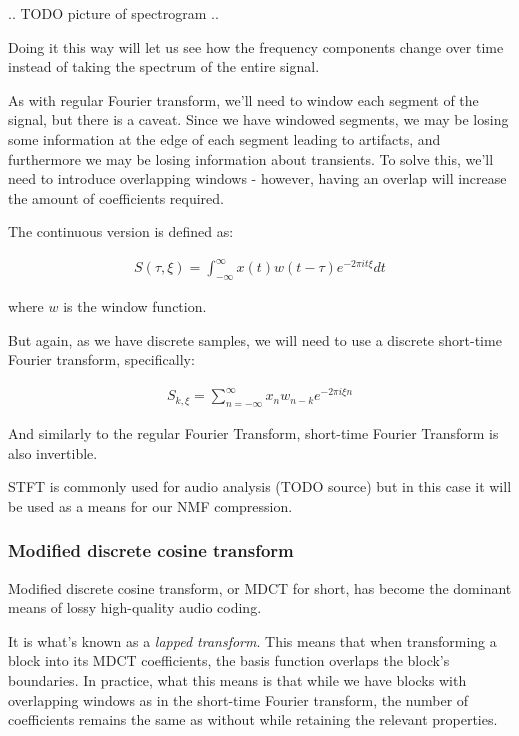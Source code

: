 .. TODO picture of spectrogram ..

Doing it this way will let us see how the frequency components change over time instead of taking the spectrum of the entire signal.

As with regular Fourier transform, we'll need to window each segment of the signal, but there is a caveat. Since we have windowed segments, we may be losing some information at the edge of each segment leading to artifacts, and furthermore we may be losing information about transients. To solve this, we'll need to introduce overlapping windows - however, having an overlap will increase the amount of coefficients required.

The continuous version is defined as: \cite{Recoskie2014ConstrainedNM}

\begin{align}
S(\tau, \xi) = \int_{-\infty}^{\infty}x(t)w(t-\tau)e^{-2\pi it\xi}dt
\end{align}

where $w$ is the window function.

But again, as we have discrete samples, we will need to use a discrete short-time Fourier transform, specifically:

\begin{align}
S_{k, \xi} = \sum_{n=-\infty}^{\infty}x_nw_{n-k}e^{-2\pi i\xi n}
\end{align}

And similarly to the regular Fourier Transform, short-time Fourier Transform is also invertible. \cite{selesnick_2009}

STFT is commonly used for audio analysis (TODO source) but in this case it will be used as a means for our NMF compression.

\subsubsection{Modified discrete cosine transform}
Modified discrete cosine transform, or MDCT for short, has become the dominant means of lossy high-quality audio coding. \cite{wang_vilermo_2012_mdct}

It is what's known as a \emph{lapped transform}. This means that when transforming a block into its MDCT coefficients, the basis function overlaps the block's boundaries. \cite{Malvar:1992:SPL:531523} In practice, what this means is that while we have blocks with overlapping windows as in the short-time Fourier transform, the number of coefficients remains the same as without while retaining the relevant properties.

